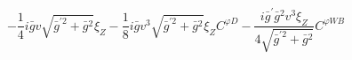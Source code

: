 %
\begin{dmath*}
%
  -  \frac{1}{4} i {\bar g}{} v \sqrt{{\bar g}^{\prime 2} + {\bar g}{}^2} \xi_Z   -  \frac{1}{8} i {\bar g}{} v^3 \sqrt{{\bar g}^{\prime 2} + {\bar g}{}^2} \xi_ZC^{ \varphi  D}  -  \frac{i {\bar g}^\prime {\bar g}{}^2 v^3 \xi_Z}{4 \sqrt{{\bar g}^{\prime 2} + {\bar g}{}^2}}C^{ \varphi  WB}
%
\end{dmath*}
%
